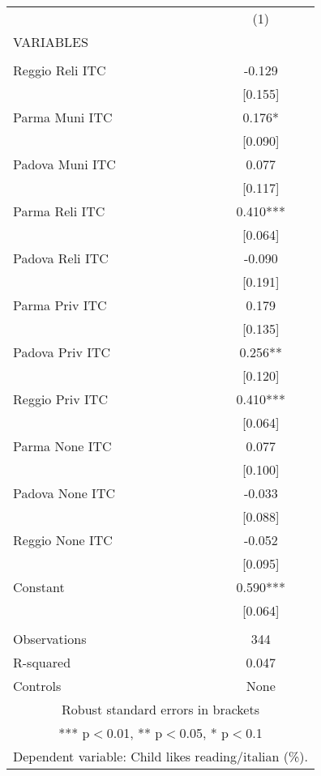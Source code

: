 \begin{tabular}{lc} \hline
 & (1) \\
VARIABLES &  \\ \hline
 &  \\
Reggio Reli ITC & -0.129 \\
 & [0.155] \\
Parma Muni ITC & 0.176* \\
 & [0.090] \\
Padova Muni ITC & 0.077 \\
 & [0.117] \\
Parma Reli ITC & 0.410*** \\
 & [0.064] \\
Padova Reli ITC & -0.090 \\
 & [0.191] \\
Parma Priv ITC & 0.179 \\
 & [0.135] \\
Padova Priv ITC & 0.256** \\
 & [0.120] \\
Reggio Priv ITC & 0.410*** \\
 & [0.064] \\
Parma None ITC & 0.077 \\
 & [0.100] \\
Padova None ITC & -0.033 \\
 & [0.088] \\
Reggio None ITC & -0.052 \\
 & [0.095] \\
Constant & 0.590*** \\
 & [0.064] \\
 &  \\
Observations & 344 \\
R-squared & 0.047 \\
 Controls & None \\ \hline
\multicolumn{2}{c}{ Robust standard errors in brackets} \\
\multicolumn{2}{c}{ *** p$<$0.01, ** p$<$0.05, * p$<$0.1} \\
\multicolumn{2}{c}{ Dependent variable: Child likes reading/italian (\%).} \\
\end{tabular}
